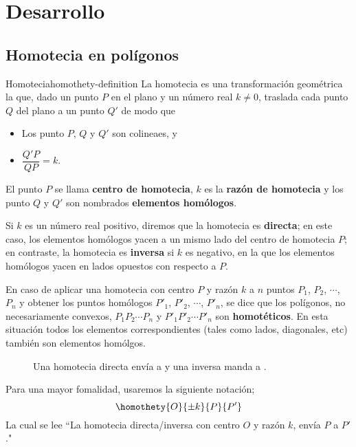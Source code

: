 \section{Desarrollo}



\subsection{Homotecia en polígonos}

\begin{section-definition.tcb}{Homotecia}{homothety-definition}
    La homotecia es una transformación geométrica la que, dado un punto $P$ en el plano y un número real $k \neq 0$, traslada cada punto $Q$ del plano a un punto $Q'$ de modo que
    \begin{itemize}
        \item Los punto $P$, $Q$ y $Q'$ son colineaes, y
        \item $\dfrac{Q' P}{QP} = k$.
    \end{itemize}
\end{section-definition.tcb}

El punto $P$ se llama \textbf{centro de homotecia}, $k$ es la \textbf{razón de homotecia} y los punto $Q$ y $Q'$ son nombrados \textbf{elementos homólogos}.

Si $k$ es un número real positivo, diremos que la homotecia es \textbf{directa}; en este caso, los elementos homólogos yacen a un mismo lado del centro de homotecia $P$; en contraste, la homotecia es \textbf{inversa} si $k$ es negativo, en la que los elementos homólogos yacen en lados opuestos con respecto a $P$.

En caso de aplicar una homotecia con centro $P$ y razón $k$ a $n$ puntos $P_1$, $P_2$, $\cdots$, $P_n$ y obtener los puntos homólogos $P'_1$, $P'_2$, $\cdots$, $P'_n$, se dice que los polígonos, no necesariamente convexos, $P_1 P_2 \cdots P_n$ y $P'_1 P'_2 \cdots P'_n$ son \textbf{homotéticos}.
En esta situación todos los elementos correspondientes (tales como lados, diagonales, etc) también son elementos homólgos.

\begin{figure}[H]
    \centering
    
    \caption{Una homotecia directa envía  a  y una inversa manda  a .}
    \label{fig:homothety-definition}
\end{figure}

\begin{remark.tcb}
    Para una mayor fomalidad, usaremos la siguiente notación;
    \[
        \homothety{O}{\pm k}{P}{P'}
    \]
    La cual se lee ``La homotecia directa/inversa con centro $O$ y razón $k$, envía $P$ a $P'$."
\end{remark.tcb}

